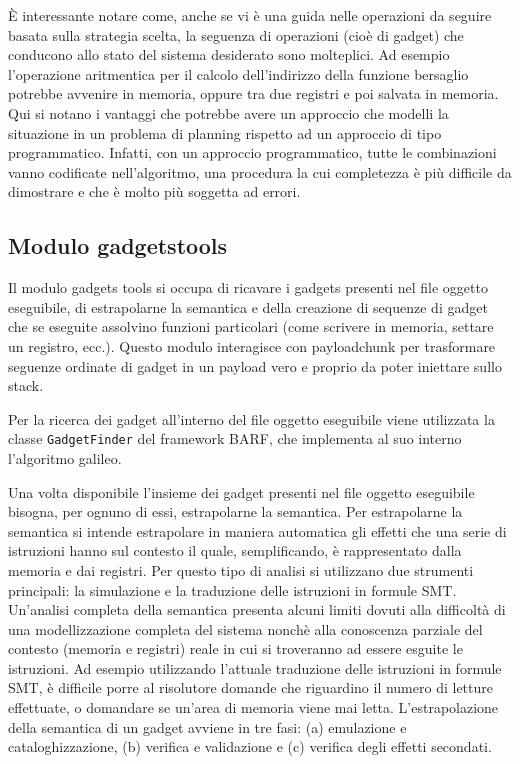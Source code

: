 È interessante notare come, anche se vi è una guida nelle operazioni
da seguire basata sulla strategia scelta, la seguenza di operazioni
(cioè di gadget) che conducono allo stato del sistema desiderato sono
molteplici. Ad esempio l'operazione aritmentica per il calcolo
dell'indirizzo della funzione bersaglio potrebbe avvenire in memoria,
oppure tra due registri e poi salvata in memoria. Qui si notano i
vantaggi che potrebbe avere un approccio che modelli la situazione in
un problema di planning rispetto ad un approccio di tipo
programmatico. Infatti, con un approccio programmatico, tutte le
combinazioni vanno codificate nell'algoritmo, una procedura la cui
completezza è più difficile da dimostrare e che è molto più soggetta
ad errori.

\subsection{Modulo gadgetstools}

Il modulo gadgets tools si occupa di ricavare i gadgets presenti nel
file oggetto eseguibile, di estrapolarne la semantica e della
creazione di sequenze di gadget che se eseguite assolvino funzioni
particolari (come scrivere in memoria, settare un registro,
ecc.). Questo modulo interagisce con payloadchunk per trasformare
seguenze ordinate di gadget in un payload vero e proprio da poter
iniettare sullo stack.

Per la ricerca dei gadget all'interno del file oggetto eseguibile
viene utilizzata la classe \lstinline{GadgetFinder} del framework
BARF, che implementa al suo interno l'algoritmo galileo\cite{roemer-12}. 


Una volta disponibile l'insieme dei gadget presenti nel file oggetto
eseguibile bisogna, per ognuno di essi, estrapolarne la semantica. Per
estrapolarne la semantica si intende estrapolare in maniera automatica
gli effetti che una serie di istruzioni hanno sul contesto il quale,
semplificando, è rappresentato dalla memoria e dai registri. Per
questo tipo di analisi si utilizzano due strumenti principali: la
simulazione e la traduzione delle istruzioni in formule
SMT. Un'analisi completa della semantica presenta alcuni limiti dovuti
alla difficoltà di una modellizzazione completa del sistema nonchè
alla conoscenza parziale del contesto (memoria e registri) reale in
cui si troveranno ad essere esguite le istruzioni. Ad esempio
utilizzando l'attuale traduzione delle istruzioni in formule SMT, è
difficile porre al risolutore domande che riguardino il numero di
letture effettuate, o domandare se un'area di memoria viene mai
letta. L'estrapolazione della semantica di un gadget avviene in tre
fasi: (a) emulazione e cataloghizzazione, (b) verifica e validazione e
(c) verifica degli effetti secondati.

